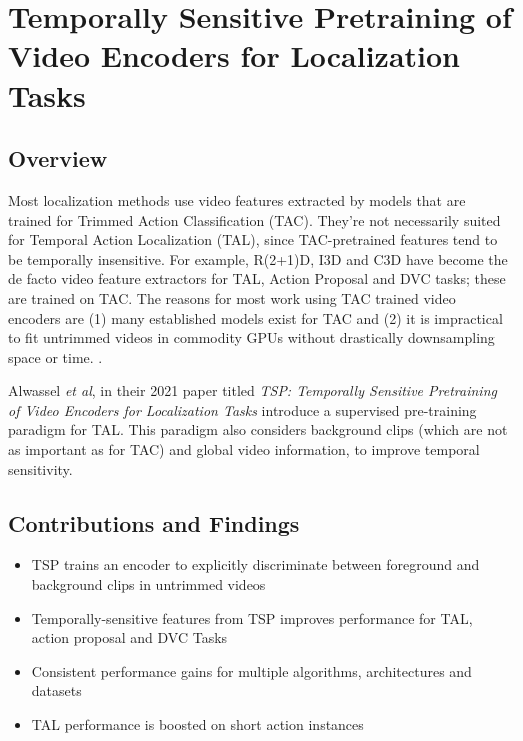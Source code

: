 \section{Temporally Sensitive Pretraining of Video Encoders for Localization Tasks} \label{appendix:tsp-paper}

\subsection{Overview}
Most localization methods use video features extracted by models that are trained for Trimmed 
Action Classification (TAC). They're not necessarily suited for Temporal Action Localization 
(TAL), since TAC-pretrained features tend to be temporally insensitive. For example, R(2+1)D, 
I3D and C3D have become the de facto video feature extractors for TAL, Action Proposal and DVC 
tasks; these are trained on TAC. The reasons for most work using TAC trained video encoders 
are (1) many established models exist for TAC and (2) it is impractical to fit untrimmed 
videos in commodity GPUs without drastically downsampling space or time. 
\cite{alwassel2021tsp}. 

\par Alwassel \textit{et al}, in their 2021 paper titled \textit{TSP: Temporally Sensitive 
Pretraining of Video Encoders for Localization Tasks} introduce a supervised pre-training 
paradigm for TAL. This paradigm also considers background clips (which are not as important as 
for TAC) and global video information, to improve temporal sensitivity.

\subsection{Contributions and Findings}
\begin{itemize}
\item TSP trains an encoder to explicitly discriminate between foreground and background clips in untrimmed videos
\item Temporally-sensitive features from TSP improves performance for TAL, action proposal and DVC Tasks
\item Consistent performance gains for multiple algorithms, architectures and datasets
\item TAL performance is boosted on short action instances
\end{itemize}

